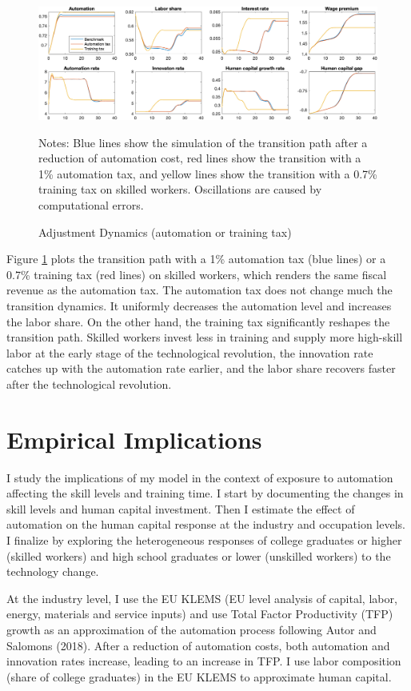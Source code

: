 \documentclass[12pt]{article}
\begin{document}
\begin{figure}[h!]
\includegraphics[width=\textwidth]{Transition3}
\caption{Adjustment Dynamics (automation or training tax)}
\label{transition3}
{\scriptsize Notes: Blue lines show the simulation of the transition path after a reduction of automation cost, red lines show the transition with a 1\% automation tax, and yellow lines show the transition with a 0.7\% training tax on skilled workers. Oscillations are caused by computational errors.}
\end{figure}

Figure \ref{transition3} plots the transition path with a 1\% automation tax (blue lines) or a 0.7\% training tax (red lines) on skilled workers, which renders the same fiscal revenue as the automation tax. The automation tax does not change much the transition dynamics. It uniformly decreases the automation level and increases the labor share. On the other hand, the training tax significantly reshapes the transition path. Skilled workers invest less in training and supply more high-skill labor at the early stage of the technological revolution, the innovation rate catches up with the automation rate earlier, and the labor share recovers faster after the technological revolution. 

\section{Empirical Implications}
I study the implications of my model in the context of exposure to automation affecting the skill levels and training time. I start by documenting the changes in skill levels and human capital investment. Then I estimate the effect of automation on the human capital response at the industry and occupation levels. I finalize by exploring the heterogeneous responses of college graduates or higher (skilled workers) and high school graduates or lower (unskilled workers) to the technology change. 

At the industry level, I use the EU KLEMS (EU level analysis of capital, labor, energy, materials and service inputs) and use Total Factor Productivity (TFP) growth as an approximation of the automation process following Autor and Salomons (2018)\nocite{AutorSalomons2018}. After a reduction of automation costs, both automation and innovation rates increase, leading to an increase in TFP. I use labor composition (share of college graduates) in the EU KLEMS to approximate human capital. 
\end{document}
